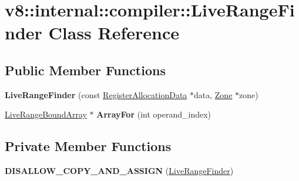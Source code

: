 \hypertarget{classv8_1_1internal_1_1compiler_1_1_live_range_finder}{}\section{v8\+:\+:internal\+:\+:compiler\+:\+:Live\+Range\+Finder Class Reference}
\label{classv8_1_1internal_1_1compiler_1_1_live_range_finder}
\subsection*{Public Member Functions}
\begin{DoxyCompactItemize}
\item 
{\bfseries Live\+Range\+Finder} (const \hyperlink{classv8_1_1internal_1_1compiler_1_1_register_allocation_data}{Register\+Allocation\+Data} $\ast$data, \hyperlink{classv8_1_1internal_1_1_zone}{Zone} $\ast$zone)\hypertarget{classv8_1_1internal_1_1compiler_1_1_live_range_finder_aa466311c1598d719296a7bd732ae155d}{}\label{classv8_1_1internal_1_1compiler_1_1_live_range_finder_aa466311c1598d719296a7bd732ae155d}

\item 
\hyperlink{classv8_1_1internal_1_1compiler_1_1_live_range_bound_array}{Live\+Range\+Bound\+Array} $\ast$ {\bfseries Array\+For} (int operand\+\_\+index)\hypertarget{classv8_1_1internal_1_1compiler_1_1_live_range_finder_ac9eaa169d8d8480eeb220ef091d46820}{}\label{classv8_1_1internal_1_1compiler_1_1_live_range_finder_ac9eaa169d8d8480eeb220ef091d46820}

\end{DoxyCompactItemize}
\subsection*{Private Member Functions}
\begin{DoxyCompactItemize}
\item 
{\bfseries D\+I\+S\+A\+L\+L\+O\+W\+\_\+\+C\+O\+P\+Y\+\_\+\+A\+N\+D\+\_\+\+A\+S\+S\+I\+GN} (\hyperlink{classv8_1_1internal_1_1compiler_1_1_live_range_finder}{Live\+Range\+Finder})\hypertarget{classv8_1_1internal_1_1compiler_1_1_live_range_finder_a379d3f3addfc8e3037d678d8042b9014}{}\label{classv8_1_1internal_1_1compiler_1_1_live_range_finder_a379d3f3addfc8e3037d678d8042b9014}

\end{DoxyCompactItemize}
